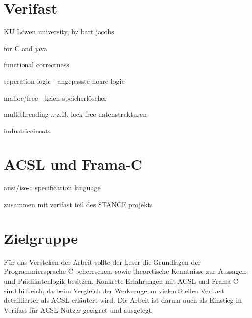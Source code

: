 \section{Verifast}
\label{sec:verifast}



KU Löwen university, by bart jacobs


for C and java


functional correctness


seperation logic - angepasste hoare logic


malloc/free - keien speicherlöscher


multithreading .. z.B. lock free datenstrukturen


industrieeinsatz

\section{ACSL und Frama-C}
\label{acsl-und-frama-c}

ansi/iso-c specification language


zusammen mit verifast teil des STANCE projekts

\section{Zielgruppe}
\label{sec:zielgruppe}

Für das Verstehen der Arbeit sollte der Leser die Grundlagen der Programmiersprache C beherrschen.
sowie theoretische Kenntnisse zur Aussagen- und Prädikatenlogik besitzen.
Konkrete Erfahrungen mit ACSL und Frama-C sind hilfreich, da beim Vergleich der Werkzeuge an vielen
Stellen Verifast detaillierter als ACSL erläutert wird. Die Arbeit ist darum auch als Einstieg in Verifast
für ACSL-Nutzer geeignet und ausgelegt.

 


